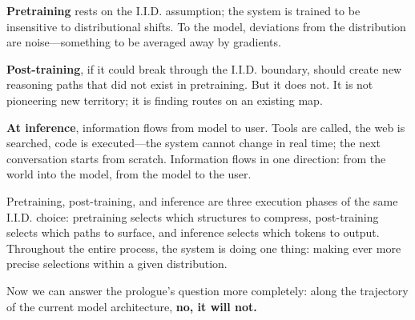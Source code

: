 



\textbf{Pretraining} rests on the I.I.D. assumption; the system is trained to be insensitive to distributional shifts. To the model, deviations from the distribution are noise---something to be averaged away by gradients.

\textbf{Post-training}, if it could break through the I.I.D. boundary, should create new reasoning paths that did not exist in pretraining. But it does not. It is not pioneering new territory; it is finding routes on an existing map.

\textbf{At inference}, information flows from model to user. Tools are called, the web is searched, code is executed---the system cannot change in real time; the next conversation starts from scratch.
Information flows in one direction: from the world into the model, from the model to the user.

Pretraining, post-training, and inference are three execution phases of the same I.I.D. choice: pretraining selects which structures to compress, post-training selects which paths to surface, and inference selects which tokens to output. Throughout the entire process, the system is doing one thing: making ever more precise selections within a given distribution.







\vspace{0.8em}

Now we can answer the prologue's question more completely: along the trajectory of the current model architecture, \textbf{no, it will not.}

